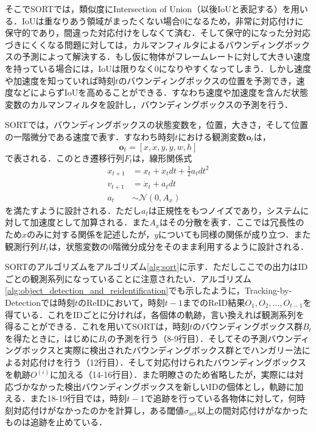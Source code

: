     そこでSORTでは，類似度にIntersection of Union（以後IoUと表記する）を用いる．IoUは重なりあう領域がまったくない場合$0$になるため，非常に対応付けに保守的であり，間違った対応付けをしなくて済む．そして保守的になった分対応づきにくくなる問題に対しては，カルマンフィルタによるバウンディングボックスの予測によって解決する．もし仮に物体がフレームレートに対して大きい速度を持っている場合には，IoUは限りなく0になりやすくなってしまう．しかし速度や加速度を知っていれば時刻$t$のバウンディングボックスの位置を予測でき，速度などによらずIoUを高めることができる．すなわち速度や加速度を含んだ状態変数のカルマンフィルタを設計し，バウンディングボックスの予測を行う．

    SORTでは，バウンディングボックスの状態変数を，位置，大きさ，そして位置の一階微分である速度で表す．すなわち時刻$t$における観測変数$\bm{o}_t$は，
    \begin{equation}
        \label{eq:sort_state_vector}
        \bm{o}_t = \left[x, \dot{x}, y, \dot{y}, w, h\right]
    \end{equation}
    で表される．このとき遷移行列$F_t$は，線形関係式
    \begin{equation}
        \label{eq:sort_transition}
        \begin{aligned}
            x_{t+1} &= x_t + \dot{x}_t dt + \frac{1}{2} a_t dt^2
            \\v_{t+1} &= \dot{x}_t + a_t dt
            \\a_t &\sim \mathcal{N}(0, A_x)
        \end{aligned}
    \end{equation}
    を満たすように設計される．ただし$a_t$は正規性をもつノイズであり，システムに対して加速度として加算される．また$A_x$はその分散を表す．ここでは冗長性のため$x$のみに対する関係を記述したが，$y$についても同様の関係が成り立つ．また観測行列$H_t$は，状態変数の$0$階微分成分をそのまま利用するように設計される．

    SORTのアルゴリズムをアルゴリズム\ref{alg:sort}に示す．ただしここでの出力はIDごとの観測系列になっていることに注意されたい．アルゴリズム\ref{alg:object_detection_and_reidentification}でも示したように，Tracking-by-Detectionでは時刻$t$のReIDにおいて，時刻$t-1$までのReID結果$O_1, O_2, \dots, O_{t-1}$を得ている．これをIDごとに分ければ，各個体の軌跡，言い換えれば観測系列を得ることができる．これを用いてSORTは，時刻$t$のバウンディングボックス群$B_t$を得たときに，はじめに$B_t$の予測を行う（8-9行目）．そしてその予測バウンディングボックスと実際に検出されたバウンディングボックス群とでハンガリー法による対応付けを行う（12行目）．そして対応付けられたバウンディングボックスを軌跡$O^{(i)}$に加える（14-16行目）．また明瞭さのため省略したが，実際には対応づかなかった検出バウンディングボックスを新しいIDの個体とし，軌跡に加える．また18-19行目では，時刻$t-1$で追跡を行っている各物体に対して，何時刻対応付けがなかったのかを計算し，ある閾値$\sigma_{\text{act}}$以上の間対応付けがなかったものは追跡を止めている．

